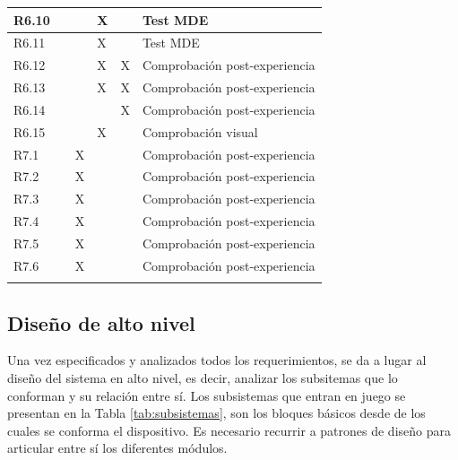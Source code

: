 \begin{longtable}[c]{llllll}
R6.10 &  &  & X &  & Test MDE \\ \hline
R6.11 &  &  & X &  & Test MDE \\ \hline
R6.12 &  &  & X & X & Comprobación post-experiencia \\ \hline
R6.13 &  &  & X & X & Comprobación post-experiencia \\ \hline
R6.14 &  &  &  & X & Comprobación post-experiencia \\ \hline
R6.15 &  &  & X &  & Comprobación visual \\ \hline
R7.1 &  & X &  &  & Comprobación post-experiencia \\ \hline
R7.2 &  & X &  &  & Comprobación post-experiencia \\ \hline
R7.3 &  & X &  &  & Comprobación post-experiencia \\ \hline
R7.4 &  & X &  &  & Comprobación post-experiencia \\ \hline
R7.5 &  & X &  &  & Comprobación post-experiencia \\ \hline
R7.6 &  & X &  &  & Comprobación post-experiencia \\ \hline
\label{tab:matrizTrazabilidad}\\
\end{longtable}

\normalsize


\subsection{Diseño de alto nivel} \label{disAltoNivel}

Una vez especificados y analizados todos los requerimientos, se da a lugar al diseño del sistema en alto nivel, es decir, analizar los subsitemas que lo conforman y su relación entre sí. Los subsistemas que entran en juego se presentan en la Tabla \ref{tab:subsistemas}, son los bloques básicos desde de los cuales se conforma el dispositivo. Es necesario recurrir a patrones de diseño \citep{douglass2011} para articular entre sí los diferentes módulos.

